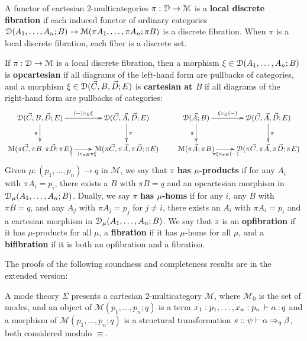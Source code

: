 \documentclass[a4paper,USenglish,numberwithinsect]{lipics-v2016}
\newcommand\deq{\ensuremath{\equiv}}
\renewcommand{\oftp}[3]{\ensuremath{#1 \, \vdash #2 \, \dcd{:} \, #3}}
\def\M{\mathcal{M}}
\begin{document}
\begin{definition}
  A functor of cartesian 2-multicategories $\pi:\cD\to\M$ is a
  \textbf{local discrete fibration} if each induced functor of ordinary
  categories $\cD(A_1,\dots,A_n;B)\to\M(\pi A_1,\dots,\pi A_n;\pi B)$ is
  a discrete fibration.  When $\pi$ is a local discrete fibration, each
  fiber is a discrete set.
\end{definition}

\begin{definition}
  If $\pi:\cD\to\M$ is a local discrete fibration, then a morphism
  $\xi\in\mathcal{D}(A_1,\dots,A_n;B)$ is \textbf{opcartesian} if all diagrams
  of the left-hand form are pullbacks of categories, and a morphism
  $\xi\in\mathcal{D}(\vec C,B,\vec D;E)$ is \textbf{cartesian at $B$} if all
  diagrams of the right-hand form are pullbacks of categories: 
  \[ \xymatrix{
    \cD(\vec C,B,\vec D;E) \ar[r]^-{(-)\circ_B \xi} \ar[d]_\pi &
    \cD(\vec C,\vec A,\vec D;E) \ar[d]^\pi \\
    \M(\pi\vec C,\pi B, \pi\vec D; \pi E) \ar[r]_-{(-)\circ_{\pi B} \pi\xi} &
    \M(\pi\vec C,\pi\vec A,\pi\vec D;\pi E)
  }
  \qquad
  \xymatrix{
    \cD(\vec A;B) \ar[r]^-{\xi\circ_B (-)} \ar[d]_\pi &
    \cD(\vec C,\vec A,\vec D;E) \ar[d]^\pi \\
    \M(\pi\vec A;\pi B) \ar[r]_-{\pi\xi\circ_{\pi B} (-)} &
    \cD(\pi\vec C,\pi\vec A,\pi\vec D;\pi E)}
  \]
  Given $\mu:(p_1,\dots,p_n) \to q$ in $\M$, we say that $\pi$ \textbf{has $\mu$-products} if for any $A_i$ with $\pi A_i = p_i$, there exists a $B$ with $\pi B = q$ and an opcartesian morphism in $\mathcal{D}_\mu(A_1,\dots,A_n;B)$.
  Dually, we say $\pi$ \textbf{has $\mu$-homs} if for any $i$, any $B$ with $\pi B = q$, and any $A_j$ with $\pi A_j = p_j$ for $j\neq i$, there exists an $A_i$ with $\pi A_i = p_i$ and a cartesian morphism in $\mathcal{D}_\mu(A_1,\dots,A_n;B)$.
  We say that $\pi$ is an \textbf{opfibration} if it has $\mu$-products for all $\mu$, a \textbf{fibration} if it has $\mu$-homs for all $\mu$, and a \textbf{bifibration} if it is both an opfibration and a fibration.
\end{definition}

The proofs of the following soundness and completeness results are in
the extended version:

\begin{theorem}
\label{thm:completeness-mode-theory}
A mode theory $\Sigma$ presents a cartesian 2-multicategory $\M$, where
$\M_0$ is the set of modes, and an object of $\M(p_1,\ldots,p_n;q)$ is a
term $\oftp{x_1:p_1,\ldots,x_n:p_n}{\alpha}{q}$ and a morphism of $\M(p_1,\ldots,p_n;q)$ is a structural transformation
$s :: \psi \vdash \alpha \Rightarrow_{q} \beta$, both considered modulo $\deq$.
\end{theorem}
\end{document}
